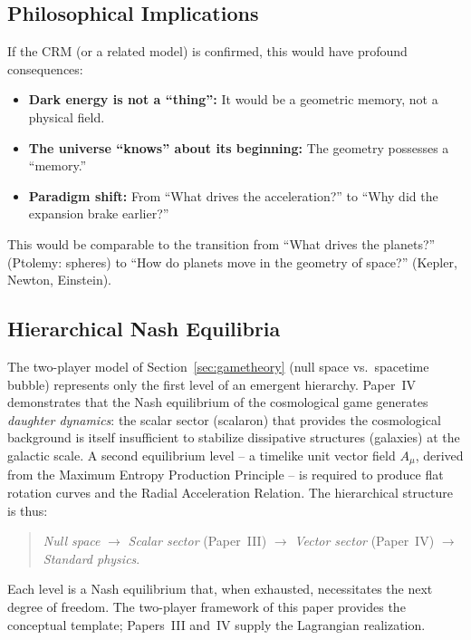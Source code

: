 \documentclass[aps,prd,twocolumn,superscriptaddress,nofootinbib]{revtex4-2}
\begin{document}
\subsection{Philosophical Implications}

If the CRM (or a related model) is confirmed, this would have profound consequences:

\begin{itemize}
\item \textbf{Dark energy is not a ``thing'':} It would be a geometric memory, not a physical field.
\item \textbf{The universe ``knows'' about its beginning:} The geometry possesses a ``memory.''
\item \textbf{Paradigm shift:} From ``What drives the acceleration?'' to ``Why did the expansion brake earlier?''
\end{itemize}

This would be comparable to the transition from ``What drives the planets?'' (Ptolemy: spheres) to ``How do planets move in the geometry of space?'' (Kepler, Newton, Einstein).

\subsection{Hierarchical Nash Equilibria}
\label{subsec:hierarchical_nash}

The two-player model of Section~\ref{sec:gametheory} (null space vs.\ spacetime bubble) represents only the first level of an emergent hierarchy. Paper~IV \cite{Geiger2026d} demonstrates that the Nash equilibrium of the cosmological game generates \emph{daughter dynamics}: the scalar sector (scalaron) that provides the cosmological background is itself insufficient to stabilize dissipative structures (galaxies) at the galactic scale. A second equilibrium level -- a timelike unit vector field $A_\mu$, derived from the Maximum Entropy Production Principle -- is required to produce flat rotation curves and the Radial Acceleration Relation. The hierarchical structure is thus:
\begin{quote}
\textit{Null space} $\to$ \textit{Scalar sector} (Paper~III) $\to$ \textit{Vector sector} (Paper~IV) $\to$ \textit{Standard physics}.
\end{quote}
Each level is a Nash equilibrium that, when exhausted, necessitates the next degree of freedom. The two-player framework of this paper provides the conceptual template; Papers~III and~IV supply the Lagrangian realization.
\end{document}
